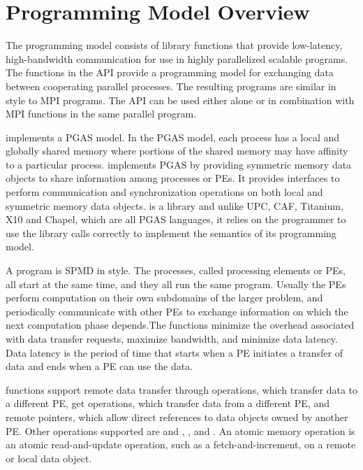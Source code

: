\section{Programming Model Overview}
The \openshmem programming model consists of library functions that provide
low-latency, high-bandwidth communication  for  use  in  highly  parallelized 
scalable programs. The functions in the \openshmem \ac{API} provide a programming 
model for exchanging data between cooperating parallel processes. The resulting programs are similar 
in style to \ac{MPI} programs. The \openshmem \ac{API} can be used either alone 
or in combination with \ac{MPI} functions in the same parallel program.

\openshmem implements a \ac{PGAS} model. In the \ac{PGAS} model, each process has a local and 
globally shared memory where portions of the shared memory may have affinity to a particular process. \openshmem 
implements \ac{PGAS} by providing symmetric memory data objects to share information among processes or \ac{PE}s.   
It provides interfaces to perform communication and synchronization operations on both local and symmetric memory data objects. 
\openshmem is a library and unlike UPC, CAF, Titanium, X10 and Chapel, which are all
PGAS languages, it relies on the programmer to use the library calls correctly to implement the semantics of its programming model.

A \openshmem program is \ac{SPMD} in style. The
\openshmem  processes,  called  processing elements or \ac{PE}s, all start at the
same time, and they all run the same program.  Usually the \ac{PE}s  perform
computation on their own subdomains of the larger problem, and periodically 
communicate with other \ac{PE}s to exchange information on which the
next computation phase depends.The \openshmem functions minimize the overhead associated with data transfer
requests, maximize bandwidth, and minimize data latency.  Data latency
is  the  period  of  time that starts when a \ac{PE} initiates a transfer of data 
and ends when a \ac{PE} can use the data.

\openshmem functions support remote data transfer through  operations, which  transfer data to a 
different \ac{PE}, get operations, which transfer data from a different \ac{PE}, and remote pointers, which 
allow direct  references  to  data objects owned by another \ac{PE}. Other operations supported are  
 and , , and . 
An atomic memory operation  is an atomic read-and-update operation, such as a fetch-and-increment, on a remote
or local data object.


